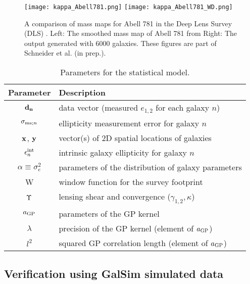 \begin{figure}
	\centering
	\texttt{[image: kappa\_Abell781.png]}
	\texttt{[image: kappa\_Abell781\_WD.png]}
	\caption{A comparison of mass maps for Abell 781 in the Deep Lens Survey (DLS) 
		\label{fig:Abell781_massmap}.  Left: The smoothed mass map of Abell 781 from 
		Right: The output generated with 6000
		galaxies. 
	These figures are part of Schneider et al. (in prep.).
}
\end{figure}



\begin{table}%
\begin{center}
\caption{Parameters for the statistical model.}
\label{tab:sampling_parameters}
\begin{tabular}{cl}
\hline
Parameter & Description \\
\hline
${\bf d_{n}}$ & data vector (measured $e_{1,2}$ for each galaxy $n$)  \\
$\sigma_{{\rm ms}; n}$ & ellipticity measurement error for galaxy $n$ 
\\
$\mathbf{x}$, $\mathbf{y}$ & vector(s) of 2D spatial locations of galaxies \\
$\epsilon_n^{\rm int}$ & intrinsic galaxy ellipticity for galaxy $n$ \\
$\alpha\equiv\sigma_{e}^2$ & parameters of the distribution of galaxy parameters \\
W & window function for the survey footprint \\
$\Upsilon$ & lensing shear and convergence ($\gamma_{1,2}, \kappa$) \\
$a_{\rm GP}$ & parameters of the GP kernel\\
$\lambda$ & precision of the GP kernel (element of $a_{\rm GP}$) \\
$l^2$ & squared GP correlation length (element of $a_{\rm GP}$) \\
\hline
\end{tabular}
\end{center}
\end{table}



\subsection{Verification using {\sc GalSim} simulated data}
